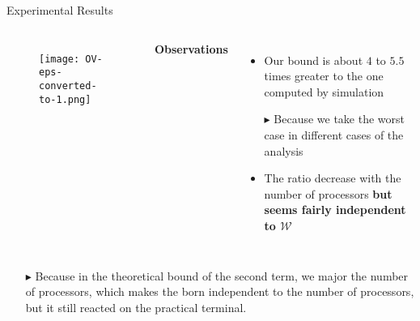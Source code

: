 \documentclass{beamer}
\begin{document}
\begin{frame}{Experimental Results}

    \begin{columns} 
        \begin{figure}
            \texttt{[image: OV-eps-converted-to-1.png]}
        \end{figure}
            \textbf{Observations}
            \begin{itemize}
                \item Our bound is about \alert{$4$} to \alert{$5.5$} times greater to the one computed by simulation  
                    \pause
                \item [\scriptsize\raise1.25pt\hbox{\donotcoloroutermaths$\blacktriangleright$}] 
                    \alert{Because we take the worst case in different cases of the analysis}  
                    \pause
                \item The ratio decrease with the number of processors \textbf{but seems fairly independent to $\mathcal{W}$ }
            \end{itemize}
    \end{columns}
            \begin{itemize}
                    \pause
                  \item  [\scriptsize\raise1.25pt\hbox{\donotcoloroutermaths$\blacktriangleright$}]
                      \alert{Because in the theoretical bound of the second term, we major the number of processors,
                      which makes the born independent to the number of processors, 
                      but it still reacted on the practical terminal. }
            \end{itemize}

\end{frame}
\end{document}
